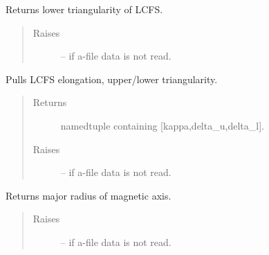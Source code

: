 \documentclass[letterpaper,10pt,english]{sphinxmanual}
\begin{document}
\begin{fulllineitems}
\begin{fulllineitems}
\begin{quote}
\begin{description}
\end{description}\end{quote}

\end{fulllineitems}


\begin{fulllineitems}
\label{eqtools:eqtools.eqdskreader.EqdskReader.getLowerTriangularity}
Returns lower triangularity of LCFS.
\begin{quote}\begin{description}
\item[{Raises }] \leavevmode
{} -- 
if a-file data is not read.

\end{description}\end{quote}

\end{fulllineitems}


\begin{fulllineitems}
\label{eqtools:eqtools.eqdskreader.EqdskReader.getShaping}
Pulls LCFS elongation, upper/lower triangularity.
\begin{quote}\begin{description}
\item[{Returns}] \leavevmode
namedtuple containing {[}kappa,delta\_u,delta\_l{]}.

\item[{Raises }] \leavevmode
{} -- 
if a-file data is not read.

\end{description}\end{quote}

\end{fulllineitems}


\begin{fulllineitems}
\label{eqtools:eqtools.eqdskreader.EqdskReader.getMagR}
Returns major radius of magnetic axis.
\begin{quote}\begin{description}
\item[{Raises }] \leavevmode
{} -- 
if a-file data is not read.


\end{description}
\end{quote}
\end{fulllineitems}
\end{fulllineitems}
\end{document}
